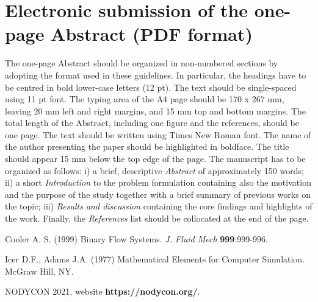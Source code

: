 \documentclass[11pt]{nodycon2021}
\begin{document}
\section{Electronic submission of the one-page Abstract (PDF format)}
The one-page  Abstract should be organized in non-numbered sections  by adopting the format used in these guidelines. In particular, the headings have to be centred in bold lower-case letters (12 pt). The text should be single-spaced using 11 pt font. The typing area of the A4 page should be 170 x 267 mm, leaving 20 mm left and right margins, and 15 mm top and bottom margins. The total length of the  Abstract, including one figure and the references, should be one page. The text should be written using Times New Roman font. The name of the author presenting the paper should be highlighted in boldface. The title should appear 15 mm below the top edge of the page. The manuscript has to be organized as follows: i) a brief, descriptive \textit{Abstract} of approximately 150 words; ii) a short \textit{Introduction} to the problem formulation containing also the motivation and the purpose of the study together with a brief summary of previous works on the topic; iii) \textit{Results and discussion} containing the core  findings and highlights  of the work. Finally, the \textit{References} list should be collocated at the end of the page. 

\begin{thebibliography}{99}

 Cooler A. S. (1999) Binary Flow Systems.  {\em J. Fluid Mech}  {\bf 999}:999-996.

	Icer D.F., Adams J.A. (1977) Mathematical Elements for Computer Simulation. McGraw Hill, NY.

	NODYCON 2021, website \textbf{https://nodycon.org/}.

\end{thebibliography}
 
\end{document}
